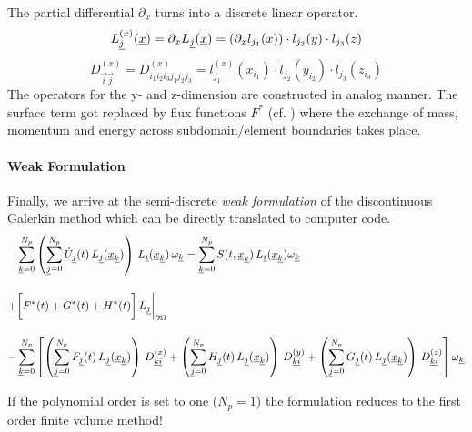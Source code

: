 The partial differential
$\partial_x$ turns into a discrete linear operator.
\newcommand{\DXKI}{D^{(x)}_{\vec{k}\vec{i}}}
\newcommand{\DYKI}{D^{(y)}_{\vec{k}\vec{i}}}
\newcommand{\DZKI}{D^{(z)}_{\vec{k}\vec{i}}}
\begin{equation}
    L^{(x)}_{\underline{j}}(\underline{x}) = \partial_x L_{\underline{j}}(\underline{x}) = (\partial_x l_{j_1}(x)) \cdot l_{j_2}(y) \cdot l_{j_3}(z)
\end{equation}
\begin{equation}
    D^{(x)}_{\vec{i}\vec{j}} = D^{(x)}_{i_1i_2i_3j_1j_2j_3} = l^{(x)}_{j_1}(x_{i_1})\cdot l_{j_2}(y_{i_2}) \cdot l_{j_3}(z_{i_3})
\end{equation}
The operators for the y- and z-dimension are constructed in analog manner.  The
surface term got replaced by flux functions $F^*$ (cf. )
where the exchange of mass, momentum and energy across subdomain/element
boundaries takes place.

\paragraph{Weak Formulation}
Finally, we arrive at the semi-discrete \emph{weak formulation} of the
discontinuous Galerkin method which can be directly translated to computer
code.
\begin{align}
\label{eqn:semi-discrete-weak-formulation}
     &\sumK \left(\sumJ \UJ \, \LJK \right) \, \LIK \,\wK = \sumK \STXK \, \LIK \wK \nonumber \br
    +&\bigg[ F^*(t) + G^*(t) + H^*(t)\bigg]\, L_{\vec{j}}\bigg|_{\partial\Omega} \br
    -&\sumK \left[
          \left(\sumJ \FJ \, \LJK \right) \, \DXKI 
        + \left(\sumJ \HJ \, \LJK \right) \, \DYKI
        + \left(\sumJ \GJ \, \LJK \right) \, \DZKI \right] \wK \nonumber
\end{align}

\remark If the polynomial order is set to one ($N_p = 1$) the formulation reduces
to the first order finite volume method!
